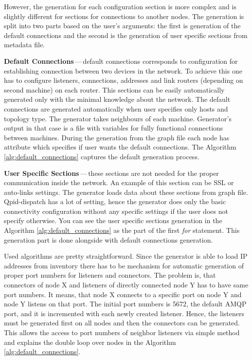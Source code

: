 However, the generation for each configuration section is more complex and is slightly different for sections for connections to another nodes. The generation is split into two parts based on the user's arguments: the first is generation of the default connections and the second is the generation of user specific sections from metadata file.

\begin{description}
	\item \textbf{Default Connections}\,---\,default connections corresponds to configuration for establishing connection between two devices in the network. To achieve this one has to configure listeners, connections, addresses and link routers (depending on second machine) on each router. This sections can be easily automatically generated only with the minimal knowledge about the network. The default connections are generated automatically when user specifies only hosts and topology type. The generator takes neighbours of each machine. Generator's output in that case is a file with variables for fully functional connections between machines. During the generation from the graph file each node has attribute which specifies if user wants the default connections. The Algorithm \ref{alg:default_connections} captures the default generation process.

	\item \textbf{User Specific Sections}\,---\,these sections are not needed for the proper communication inside the network. An example of this section can be SSL or auto-links settings. The generator loads data about these sections from graph file. Qpid-dispatch has a lot of setting, hence the generator does only the basic connectivity configuration without any specific settings if the user does not specify otherwise. You can see the user specific sections generation in the Algorithm \ref{alg:default_connections} as the part of the first \emph{for} statement. This generation part is done alongside with default connections generation.

\end{description}

Used algorithms are pretty straightforward. Since the generator is able to load IP addresses from inventory there has to be mechanism for automatic generation of proper port numbers for listeners and connectors. The problem is, that connectors of node X and listeners of directly connected node Y has to have same port numbers. It means, that node X connects to a specific port on node Y and node Y listens on that port. The initial port numbers is 5672, the default AMQP port, and it is incremented with each newly created listener. Hence, the listeners must be generated first on all nodes and then the connectors can be generated. This allows the access to port numbers of neighbor listeners via simple method and explains the double loop over nodes in the Algorithm \ref{alg:default_connections}.

